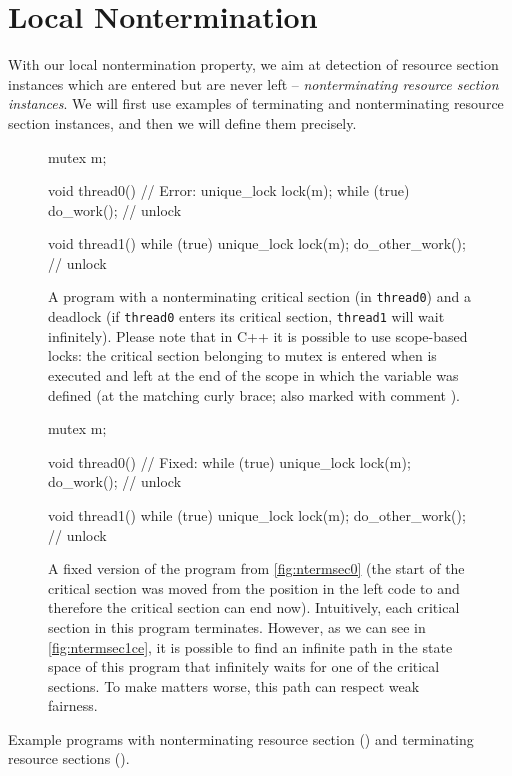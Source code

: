 \section{Local Nontermination} \label{sec:local-nontermination}

With our local nontermination property, we aim at detection of resource section instances which are entered but are never left -- \emph{nonterminating resource section instances}.
We will first use examples of terminating and nonterminating resource section instances, and then we will define them precisely.

\begin{widefigure}
\begin{subfigure}[t]{0.475\textwidth}
\begin{cppcode}
    mutex m;

    void thread0() {
      // Error:
      unique_lock lock(m);
      while (true) {
        do_work();
      }
    } // unlock

    void thread1() {
      while (true) {
        unique_lock lock(m);
        do_other_work();
      } // unlock
    }
\end{cppcode}
\caption{
    A program with a nonterminating critical section (in \texttt{thread0}) and a deadlock (if \texttt{thread0} enters its critical section, \texttt{thread1} will wait infinitely).
    Please note that in C++ it is possible to use scope-based locks: the critical section belonging to mutex  is entered when  is executed and left at the end of the scope in which the  variable was defined (at the matching curly brace; also marked with comment ).
}\label{fig:ntermsec0}
\end{subfigure}
%
\hfill
%
\begin{subfigure}[t]{0.475\textwidth}
\begin{cppcode}
    mutex m;

    void thread0() {
      // Fixed:
      while (true) {
        unique_lock lock(m);
        do_work();
      } // unlock
    }

    void thread1() {
      while (true) {
        unique_lock lock(m);
        do_other_work();
      } // unlock
    }
\end{cppcode}
\caption{
    A fixed version of the program from \autoref{fig:ntermsec0} (the start of the critical section was moved from the position  in the left code to  and therefore the critical section can end now).
    Intuitively, each critical section in this program terminates.
    However, as we can see in \autoref{fig:ntermsec1ce}, it is possible to find an infinite path in the state space of this program that infinitely waits for one of the critical sections.
    To make matters worse, this path can respect weak fairness.
} \label{fig:ntermsec1}
\end{subfigure}
\caption{Example programs with nonterminating resource section () and terminating resource sections ().
}
\end{widefigure}
